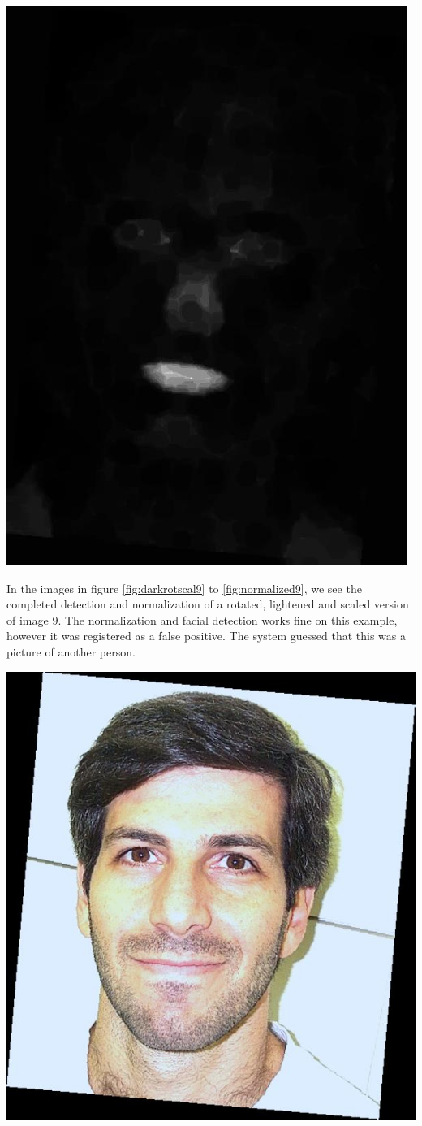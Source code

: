 \begin{Figure}
  \centering
    \includegraphics[width=0.5\columnwidth]{im7_mouth.jpg}
\end{Figure}


In the images in figure \ref{fig:darkrotscal9} to \ref{fig:normalized9}, we see the completed detection and normalization of a rotated, lightened and scaled version of image 9. The normalization and facial detection works fine on this example, however it was registered as a false positive. The system guessed that this was a picture of another person. 


\begin{Figure}
  \centering
    \includegraphics[width=0.5\columnwidth]{im9_img.jpg}
\end{Figure}

